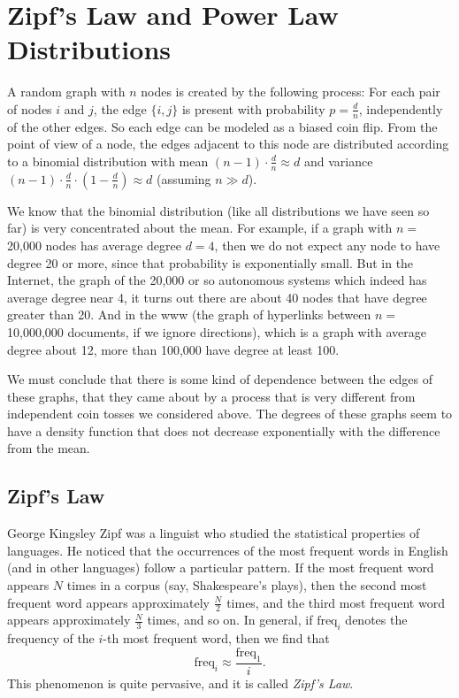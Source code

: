 \documentclass[11pt]{article}
\newcommand{\freq}{\text{freq}}
\begin{document}
\maketitle

\section*{Zipf's Law and Power Law Distributions}


A random graph with $n$ nodes is created by the following process: For each pair of nodes $i$ and $j$, the edge $\{i,j\}$ is present with probability $p = \frac{d}{n}$, independently of the other edges. So each edge can be modeled as a biased coin flip. From the point of view of a node, the edges adjacent to this node are distributed according to a binomial distribution with mean $(n-1) \cdot \frac{d}{n} \approx d$ and variance $(n-1) \cdot \frac{d}{n} \cdot (1-\frac{d}{n}) \approx d$ (assuming $n \gg d$).

We know that the binomial distribution (like all distributions we have seen so far) is very concentrated about the mean. For example, if a graph with $n = $ 20,000 nodes has average degree $d = 4$, then we do not expect any node to have degree 20 or more, since that probability is exponentially small. But in the Internet, the graph of the 20,000 or so autonomous systems which indeed has average degree near 4, it turns out there are about 40 nodes that have degree greater than 20. And in the www (the graph of hyperlinks between $n = $ 10,000,000 documents, if we ignore directions), which is a graph with average degree about 12, more than 100,000 have degree at least 100.

We must conclude that there is some kind of dependence between the edges of these graphs, that they came about by a process that is very different from independent coin tosses we considered above. The degrees of these graphs seem to have a density function that does not decrease exponentially with the difference from the mean.

\subsection*{Zipf's Law}

George Kingsley Zipf was a linguist who studied the statistical properties of languages. He noticed that the occurrences of the most frequent words in English (and in other languages) follow a particular pattern. If the most frequent word appears $N$ times in a corpus (say, Shakespeare's plays), then the second most frequent word appears approximately $\frac{N}{2}$ times, and the third most frequent word appears approximately $\frac{N}{3}$ times, and so on. In general, if $\freq_i$ denotes the frequency of the $i$-th most frequent word, then we find that
$$\freq_i \approx \frac{\freq_1}{i}.$$
This phenomenon is quite pervasive, and it is called {\em Zipf's Law}. 
\end{document}
